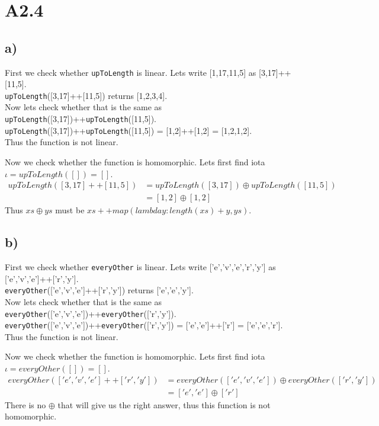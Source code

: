 \section*{A2.4}

\subsection*{a)}
First we check whether \texttt{upToLength} is linear. Lets write [1,17,11,5] as [3,17]++[11,5].\\
\texttt{upToLength}([3,17]++[11,5]) returns [1,2,3,4].\\
Now lets check whether that is the same as \texttt{upToLength}([3,17])++\texttt{upToLength}([11,5]).\\
\texttt{upToLength}([3,17])++\texttt{upToLength}([11,5]) = [1,2]++[1,2] = [1,2,1,2].\\
Thus the function is not linear.


Now we check whether the function is homomorphic. Lets first find iota $\iota = upToLength([]) = []$.\begin{align*}
upToLength([3,17]++[11,5]) &= upToLength([3,17]) \oplus upToLength([11,5])\\
&= [1,2] \oplus [1,2]
\end{align*}
Thus $xs \oplus ys$ must be $xs ++ map(lambda y: length(xs) + y, ys)$.

\subsection*{b)}
First we check whether \texttt{everyOther} is linear. Lets write ['e','v','e','r','y'] as ['e','v','e']++['r','y'].\\
\texttt{everyOther}(['e','v','e']++['r','y']) returns ['e','e','y'].\\
Now lets check whether that is the same as \texttt{everyOther}(['e','v','e'])++\texttt{everyOther}(['r','y']).\\
\texttt{everyOther}(['e','v','e'])++\texttt{everyOther}(['r','y']) = ['e','e']++['r'] = ['e','e','r'].\\
Thus the function is not linear.

Now we check whether the function is homomorphic. Lets first find iota $\iota = everyOther([]) = []$.\begin{align*}
everyOther(['e','v','e']++['r','y']) &= everyOther(['e','v','e'])\oplus everyOther(['r','y'])\\
&= ['e','e']\oplus ['r']
\end{align*}
There is no $\oplus$ that will give us the right answer, thus this function is not homomorphic.


